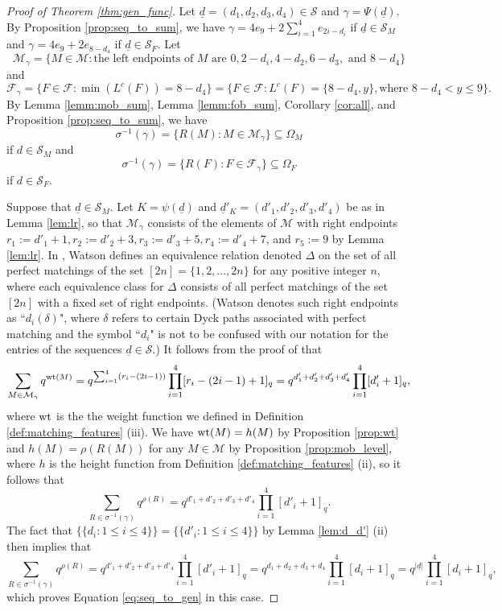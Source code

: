 \documentclass[11pt]{amsart}
\theoremstyle{plain}
\theoremstyle{definition}
\theoremstyle{remark}
\numberwithin{equation}{section}
\newcommand{\lc}{L^c}
\newcommand{\mset}[1]{\{\!\{#1\}\!\}}
\newcommand{\seqd}{\underline{d}}
\newcommand{\calf}{\mathcal{F}}
\newcommand{\calm}{\mathcal{M}}
\newcommand{\cals}{\mathcal{S}}
\newcommand{\fob}{\Omega_F}
\newcommand{\mob}{\Omega_M}
\DeclareMathOperator{\wt}{\rm{wt}}
\newcommand{\se}{\subseteq}
\newcommand{\inverse}{^{-1}}
\newcommand{\abs}[1]{\lvert #1 \rvert}
\begin{document}
\begin{proof}[Proof of Theorem \ref{thm:gen_func}]
  Let $\seqd=(d_1,d_2,d_3,d_4)\in \cals$ and $\gamma=\Psi(\seqd)$.
  By Proposition \ref{prop:seq_to_sum}, we have
  $\gamma=4e_9+2\sum_{i=1}^4e_{2i-d_i}$ if $\seqd\in \cals_M$
  and $\gamma=4e_9+2e_{8-d_4}$ if $\seqd\in \cals_F$.  
   Let 
  \[
       \calm_\gamma= \{M\in \calm: \text{the left endpoints of 
    $M$ are $0, 2-d_i, 4-d_2, 6-d_3,$ and $8-d_4$}\}
  \]
 and  
  \[
    \calf_\gamma=\{F\in \calf: \min(\lc(F))=8-d_4\}=\{F\in \calf: \lc(F)=\{8-d_4,y\},
    \text{where $8-d_4<y\le 9$}\}.
  \]
 By Lemma \ref{lemm:mob_sum}, Lemma \ref{lemm:fob_sum}, Corollary \ref{cor:all},
  and Proposition \ref{prop:seq_to_sum}, we have 
 \[
\sigma\inverse(\gamma)=\{R(M): M\in \calm_\gamma\}\se \mob\]
if $d\in \cals_M$
and 
\[
    \sigma\inverse(\gamma)=\{R(F): F\in \calf_\gamma\}\se \fob
 \] 
 if $d\in \cals_F$.



Suppose that $\seqd\in \cals_M$. Let $K=\psi(\seqd)$ and $\seqd'_K=(d'_1,d'_2,d'_3,d'_4)$ be
as in Lemma \ref{lem:lr}, so that $\calm_\gamma$ consists of the elements of
$\calm$ with right endpoints $r_1:=d'_1+1, r_2:=d'_2+3, r_3:=d'_3+5,
r_4:=d'_4+7$, and $r_5:=9$ by Lemma \ref{lem:lr}. In \cite[Section
3.3]{watson14}, Watson defines an equivalence relation denoted $\Delta$ on the
set of all perfect matchings of the set $[2n]=\{1,2,\dots, 2n\}$ for any
positive integer $n$, where each equivalence class for $\Delta$ consists of all
perfect matchings of the set $[2n]$ with a fixed set of right endpoints. (Watson
denotes such right endpoints as ``$d_i(\delta)$", where $\delta$ refers to
certain Dyck paths associated with perfect matching and the symbol ``$d_i$" is
not to be confused with our notation for the entries of the sequences $\seqd\in
\cals$.) It follows from the proof of \cite[Theorem 1]{watson14} that 
    \[
      \sum_{M\in \calm_\gamma} q^{\wt(M)}=q^{\sum_{i=1}^4
      (r_i-(2i-1))}\prod_{i=1}^4 [r_i-(2i-1)+1]_q=q^{d'_1+d'_2+d'_3+d'_4}\prod_{i=1}^4 
  [d'_i+1]_q,
    \]
where $\wt$ is the the weight function we defined in Definition
\ref{def:matching_features} (iii). We have $\wt(M)=h(M)$ by Proposition
\ref{prop:wt} and $h(M)=\rho(R(M))$ for any $M\in \calm$ by Proposition
\ref{prop:mob_level}, where $h$ is the height function from Definition
\ref{def:matching_features} (ii), so it follows that \[ \sum_{R\in
\sigma\inverse(\gamma)}q^{\rho(R)} = q^{d'_1+d'_2+d'_3+d'_4}\prod_{i=1}^4
[d'_i+1]_q. \] The fact that $\mset{d_i:1\le i\le 4}=\mset{d'_i: 1\le i\le 4}$
by Lemma \ref{lem:d_d'} (ii) then implies that \[ \sum_{R\in
  \sigma\inverse(\gamma)}q^{\rho(R)} = q^{d'_1+d'_2+d'_3+d'_4}\prod_{i=1}^4
  [d'_i+1]_q= q^{d_1+d_2+d_3+d_4}\prod_{i=1}^4
[d_i+1]_q=q^{\abs{\seqd}}\prod_{i=1}^4 [d_i+1]_q, \] which proves Equation
\eqref{eq:seq_to_gen} in this case. 


\end{proof}
\end{document}
